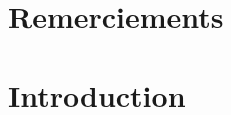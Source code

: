 \documentclass{yathesis}
\begin{document}
\chapter{Remerciements}
%
%
%
%
%
\tableofcontents[depth=chapter,name=Sommaire]
%
\listoftables
%
\listoffigures
%
\mainmatter
%
\chapter*{Introduction}
%
%
%
%
%
%
%
%
%
%
%
\end{document}
